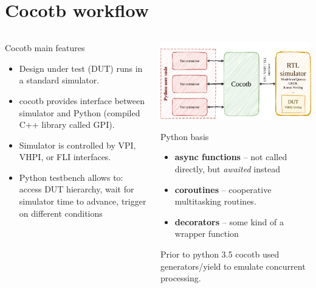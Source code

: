 \documentclass[aspectratio=169]{beamer}
\begin{document}


\section*{Cocotb workflow}
\begin{frame}{\secname}
  \begin{columns}[c]
    \begin{column}{0.5\textwidth}
      \begin{block}{Cocotb main features}
        \begin{itemize} %
          \item { Design under test (DUT) runs in a standard simulator. }
          \item { cocotb provides interface between simulator and Python (compiled C++ library called GPI).}
          \item { Simulator is controlled by VPI, VHPI, or FLI interfaces.}
          \item { Python testbench allows to: access DUT hierarchy, wait for simulator time to advance, trigger on different conditions}
        \end{itemize}
      \end{block}
      
    \end{column}
    \begin{column}{0.55\textwidth}
      \vspace*{1mm}
      \includegraphics[width=1.0\textwidth]{figs/cocotb_sim.pdf}\\
      \begin{exampleblock}{Python basis }
        \begin{itemize}
          \item {\bf async functions} -- not called directly, but {\it awaited} instead
          \item {\bf coroutines} -- cooperative multitasking routines. 
          \item {\bf decorators} -- some kind of a wrapper function 
         \end{itemize}
          Prior to python 3.5 cocotb used generators/yield to emulate concurrent processing. 
         

\end{exampleblock}
\end{column}
\end{columns}
\end{frame}
\end{document}
